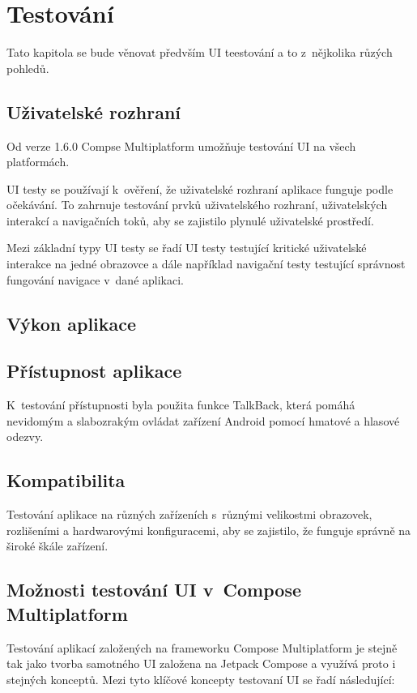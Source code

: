 \chapter{Testování} \label{testsSection}
Tato kapitola se bude věnovat předvším UI teestování a to z~nějkolika růzých pohledů. 

\section{Uživatelské rozhraní}
Od verze 1.6.0 Compse Multiplatform umožňuje testování UI na všech platformách. \cite{composeNews1.6.0}

UI testy se používají k~ověření, že uživatelské rozhraní aplikace funguje podle očekávání. To zahrnuje testování prvků uživatelského rozhraní, uživatelských 
interakcí a navigačních toků, aby se zajistilo plynulé uživatelské prostředí.

Mezi základní typy UI testy se řadí UI testy testující kritické uživatelské interakce na jedné obrazovce a dále například navigační testy testující
správnost fungování navigace v~dané aplikaci.


\section{Výkon aplikace}

\section{Přístupnost aplikace}
K~testování přístupnosti byla použita funkce TalkBack, která pomáhá nevidomým a slabozrakým ovládat zařízení Android pomocí hmatové a 
hlasové odezvy. 


\section{Kompatibilita}
Testování aplikace na různých zařízeních s~různými velikostmi obrazovek, rozlišeními a hardwarovými konfiguracemi, aby se zajistilo, že funguje 
správně na široké škále zařízení.


\section{Možnosti testování UI v~Compose Multiplatform}
Testování aplikací založených na frameworku Compose Multiplatform je stejně tak jako tvorba samotného UI založena na Jetpack Compose a využívá 
proto i stejných konceptů. Mezi tyto klíčové koncepty testovaní UI se řadí následující:


